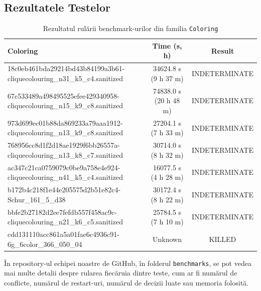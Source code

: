 \documentclass{llncs}
\begin{document}
\subsection{Rezultatele Testelor}

\begin{table}[h!]
    \centering
    \begin{tabular}{|l|c|c|}
    \hline
    \textbf{Coloring} & \textbf{Time (s, h)} & \textbf{Result} \\ \hline
    18c0eb461bda29214bd43b84199a3b61-cliquecolouring\_n31\_k5\_c4.sanitized & 34624.8 s (9 h 37 m) & INDETERMINATE \\ \hline
    67c533489a498495525efee429340958-cliquecolouring\_n15\_k9\_c8.sanitized & 74838.0 s (20 h 48 m) & INDETERMINATE \\ \hline
    973d699ec01b88da869233a79aaa1912-cliquecolouring\_n13\_k9\_c8.sanitized & 27204.1 s (7 h 33 m) & INDETERMINATE \\ \hline
    768956cc8d1f2d18ae1929f6bb26557a-cliquecolouring\_n13\_k8\_c7.sanitized & 30714.0 s (8 h 32 m) & INDETERMINATE \\ \hline
    ac347c21ca0759079c0be9a758e4e924-cliquecolouring\_n41\_k5\_c4.sanitized & 16077.5 s (4 h 28 m) & INDETERMINATE \\ \hline
    b172b4c218f1e44e205575d2b51e82c4-Schur\_161\_5\_d38 & 30172.4 s (8 h 22 m) & INDETERMINATE \\ \hline
    bbfe2b27182d2ee7fefdb557f458ac9c-cliquecolouring\_n21\_k6\_c5.sanitized & 25784.5 s (7 h 10 m) & INDETERMINATE \\ \hline
    cdd131110acc861a5a01fae6c4936c91-6g\_6color\_366\_050\_04 & Unknown & KILLED \\ \hline
    \end{tabular}
    \vspace{0.2cm}
    \caption{Rezultatul rulării benchmark-urilor din familia \texttt{Coloring}}
    \label{tab1}
\end{table}

În repository-ul echipei noastre de GitHub\cite{ref_MiniSat_our_fork}, în folderul \texttt{benchmarks}, se pot vedea mai multe detalii despre rularea fiecăruia dintre teste, cum ar fi numărul de conflicte, numărul de restart-uri, numărul de decizii luate sau memoria folosită.
\end{document}
